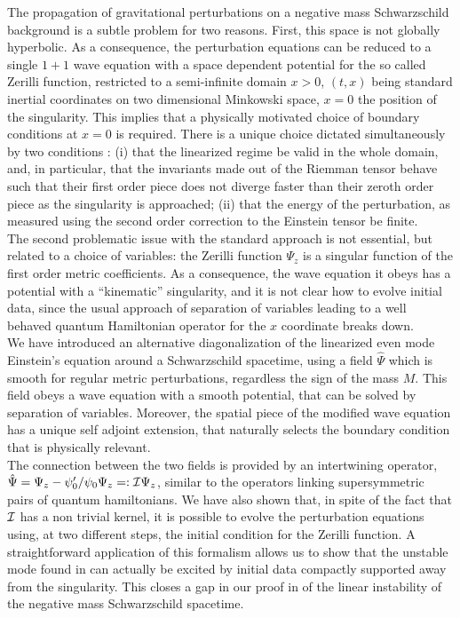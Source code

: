 \documentclass[aps,floats,showpacs,amssymb,tightenlines]{revtex4}
\begin{document}
The propagation of gravitational perturbations on a negative mass Schwarzschild background is a subtle
problem for two reasons. First, this space is not globally hyperbolic. As a consequence,
the perturbation equations can be reduced to a single $1+1$ wave equation with a space dependent potential
for the so called Zerilli function, restricted to a
semi-infinite domain $x>0$, $(t,x)$ being standard inertial coordinates on two dimensional Minkowski space,
$x=0$ the position of the singularity.
This implies that a physically motivated choice of boundary conditions
at $x=0$ is required. There is a unique choice dictated simultaneously by two conditions \cite{ghi,dg}: (i) that
the linearized regime be valid in the whole domain, and, in particular, that the invariants made out of the Riemman tensor
behave such that their first order piece does not diverge faster than their zeroth order piece as the singularity is approached;
 (ii) that the energy of
the perturbation, as measured using the second order correction to the Einstein tensor \cite{ghi} be finite.\\
The second problematic issue with the standard approach is not essential, but related to a choice of variables:
  the Zerilli function $\Psi_z$ is a singular function of the first order metric coefficients. As a consequence, the wave
equation it obeys has  a potential  with a ``kinematic'' singularity, and it is not clear how to evolve
initial data, since the usual approach of separation of variables leading to a well behaved quantum Hamiltonian operator
for the $x$ coordinate breaks down.\\
We have introduced an alternative diagonalization of the linearized even mode Einstein's equation around a Schwarzschild spacetime,
 using a field $\hat \Psi$
 which is smooth for regular metric perturbations, regardless the sign of the mass $M$. This field obeys a wave equation
with a smooth potential, that can be solved by separation of variables.  Moreover,
the spatial piece of the modified wave equation has a unique self adjoint extension, that naturally selects the boundary
condition that is physically relevant.\\
The connection between the two fields is provided by an intertwining operator,
 $\hat \Psi = \Psi_z - \psi_0'/\psi_0 \Psi_z =: {\cal I}
\Psi_z$, similar to the operators linking supersymmetric pairs of quantum hamiltonians.
We have also shown that, in spite of the fact that ${\cal I}$ has a non trivial kernel, it is possible to
evolve the perturbation equations using, at two different steps, the initial condition for the Zerilli function.
A straightforward application of this formalism allows us to show that the unstable mode
found in \cite{dg} can actually be excited by initial data compactly supported away from the singularity. This
closes a gap in our proof in \cite{dg} of the linear instability of the negative mass Schwarzschild spacetime.
\end{document}
